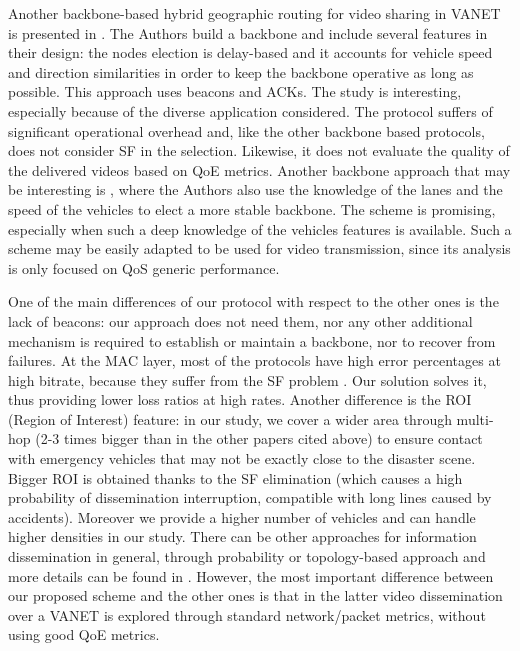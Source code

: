 \documentclass{sig-alternate-2013}
\begin{document}
Another backbone-based hybrid geographic routing for video sharing in VANET is presented in \cite{VideoBackboneDiFelice}. The Authors build a backbone and include several features in their design: the nodes election is delay-based and it accounts for vehicle speed and direction similarities in order to keep the backbone operative as long as possible. This approach uses beacons and ACKs. The study is interesting, especially because of the diverse application considered. The protocol suffers of significant operational overhead and, like the other backbone based protocols, does not consider SF in the selection.  Likewise, it does not evaluate the quality of the delivered videos based on QoE metrics.
Another backbone approach that may be interesting is \cite{medhocrubin}, where the Authors also use the knowledge of the lanes and the speed of the vehicles to elect a more stable backbone. The scheme is promising, especially when such a deep knowledge of the vehicles features is available. Such a scheme may be easily adapted to be used for video transmission, since its analysis is only focused on QoS generic performance.

One of the main differences of our protocol with respect to the other ones is the lack of beacons: our approach does not need them, nor any other additional mechanism is required to establish or maintain a backbone, nor to recover from failures.
At the MAC layer, most of the protocols have high error percentages at high bitrate, because they suffer from the SF problem \cite{VTCDeFelice}. Our solution solves it, thus providing lower loss ratios at high rates.
Another difference is the ROI (Region of Interest) feature: in our study, we cover a wider area through multi-hop (2-3 times bigger than in the other papers cited above) to ensure contact with emergency vehicles that may not be exactly close to the disaster scene. Bigger ROI is obtained thanks to the SF elimination (which causes a high probability of dissemination interruption, compatible with long lines caused by accidents). Moreover  we provide a higher number of vehicles and can handle higher densities in our study.
There can be other approaches for information dissemination in general, through probability or topology-based approach and more details can be found in \cite{dissemination}. However, the most important difference between our proposed scheme and the other ones is that in the latter video dissemination over a VANET is explored through standard network/packet metrics, without using good QoE metrics.
\end{document}
